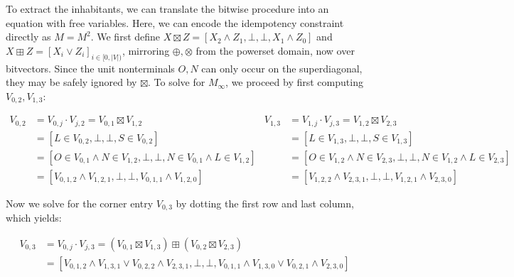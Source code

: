 \documentclass[sigplan,review,acmsmall,nonacm,anonymous]{acmart}\settopmatter{printfolios=false,printccs=false,printacmref=false}
\begin{document}

  To extract the inhabitants, we can translate the bitwise procedure into an equation with free variables. Here, we can encode the idempotency constraint directly as $M = M^2$. We first define $X \boxtimes Z = [X_2 \land Z_1, \bot, \bot, X_1 \land Z_0]$ and $X \boxplus Z = [X_i \lor Z_i]_{i \in [0, |V|)}$, mirroring $\oplus, \otimes$ from the powerset domain, now over bitvectors. Since the unit nonterminals $O, N$ can only occur on the superdiagonal, they may be safely ignored by $\boxtimes$. To solve for $M_\infty$, we proceed by first computing $V_{0, 2}, V_{1, 3}$:

  \begin{small}
  \begin{align*}
    V_{0, 2} &= V_{0, j} \cdot V_{j, 2} = V_{0, 1} \boxtimes V_{1, 2}                         &  V_{1, 3} &= V_{1, j} \cdot V_{j, 3} = V_{1, 2} \boxtimes V_{2, 3}\\
    &= [L \in V_{0, 2}, \bot, \bot, S \in V_{0, 2}]                                           &  &= [L \in V_{1, 3}, \bot, \bot, S \in V_{1, 3}]\\
    &= [O \in V_{0, 1} \land N \in V_{1, 2}, \bot, \bot, N \in V_{0, 1} \land L \in V_{1, 2}] &  &= [O \in V_{1, 2} \land N \in V_{2, 3}, \bot, \bot, N \in V_{1, 2} \land L \in V_{2, 3}]\\
    &= [V_{0, 1, 2} \land V_{1, 2, 1}, \bot, \bot, V_{0, 1, 1} \land V_{1, 2, 0}]             &  &= [V_{1, 2, 2} \land V_{2, 3, 1}, \bot, \bot, V_{1, 2, 1} \land V_{2, 3, 0}]
  \end{align*}
  \end{small}

  \noindent Now we solve for the corner entry $V_{0, 3}$ by dotting the first row and last column, which yields:

  \begin{align*}
    V_{0, 3} &= V_{0, j} \cdot V_{j, 3} = (V_{0, 1} \boxtimes V_{1, 3}) \boxplus (V_{0, 2} \boxtimes V_{2, 3})\\
    &= [V_{0, 1, 2} \land V_{1, 3, 1} \lor V_{0, 2, 2} \land V_{2, 3, 1}, \bot, \bot, V_{0, 1, 1} \land V_{1, 3, 0} \lor V_{0, 2, 1} \land V_{2, 3, 0}]
  \end{align*}
\end{document}
